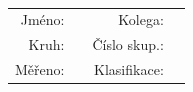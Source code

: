\documentclass[10pt]{scrartcl}
\begin{document}
\author{\Author}
\title{\Title}
\date{\Labdate}



\setlength{\parindent}{0cm}
\begin{multicols}{2}
\textsf{\textbf{\Subject \hspace{10cm} \Institute}\\
\textbf{\large{\Title}}}

\begin{tabular}{rlrl}
	 \textsf{Jméno:} & \textbf{\textsf\Author}    &      \textsf{Kolega:} & \textsf{\Coauthor} \\[1.5pt]
	  \textsf{Kruh:} & \textbf{\textsf\Group}     & \textsf{Číslo skup.:} & \textsf{\Circle}   \\[1.5pt]
	\textsf{Měřeno:} & \textbf{\textsf{\Labdate}} &  \textsf{Klasifikace}: & 
\end{tabular}


\end{multicols}
\end{document}
